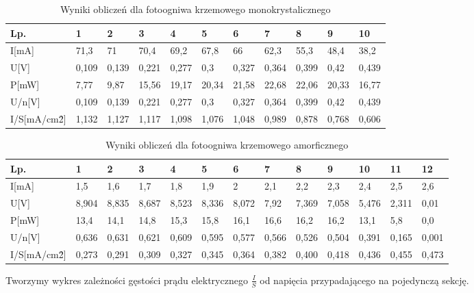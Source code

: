 \documentclass{article}
\begin{document}
\begin{table}[H]
    \centering
    \begin{tabular}{|l|l|l|l|l|l|l|l|l|l|l|}
    \hline
        Lp. & 1 & 2 & 3 & 4 & 5 & 6 & 7 & 8 & 9 & 10 \\ \hline
        I[mA] & 71,3 & 71 & 70,4 & 69,2 & 67,8 & 66 & 62,3 & 55,3 & 48,4 & 38,2 \\ \hline
        U[V] & 0,109 & 0,139 & 0,221 & 0,277 & 0,3 & 0,327 & 0,364 & 0,399 & 0,42 & 0,439 \\ \hline
        P[mW] & 7,77 & 9,87 & 15,56 & 19,17 & 20,34 & 21,58 & 22,68 & 22,06 & 20,33 & 16,77 \\ \hline
        U/n[V] & 0,109 & 0,139 & 0,221 & 0,277 & 0,3 & 0,327 & 0,364 & 0,399 & 0,42 & 0,439 \\ \hline
        I/S[mA/cm\^2] & 1,132 & 1,127 & 1,117 & 1,098 & 1,076 & 1,048 & 0,989 & 0,878 & 0,768 & 0,606   \\ \hline
    \end{tabular}
    \caption{Wyniki obliczeń dla fotoogniwa krzemowego monokrystalicznego}
     \label{obl:2}
\end{table}
\begin{table}[H]
    \centering
    \begin{tabular}{|l|l|l|l|l|l|l|l|l|l|l|l|l|}
    \hline
        Lp. & 1 & 2 & 3 & 4 & 5 & 6 & 7 & 8 & 9 & 10 & 11 & 12 \\ \hline
        I[mA] & 1,5 & 1,6 & 1,7 & 1,8 & 1,9 & 2 & 2,1 & 2,2 & 2,3 & 2,4 & 2,5 & 2,6 \\ \hline
        U[V] & 8,904 & 8,835 & 8,687 & 8,523 & 8,336 & 8,072 & 7,92 & 7,369 & 7,058 & 5,476 & 2,311 & 0,01 \\ \hline
        P[mW] & 13,4 & 14,1 & 14,8 & 15,3 & 15,8 & 16,1 & 16,6 & 16,2 & 16,2 & 13,1 & 5,8 & 0,0 \\ \hline
        U/n[V] & 0,636 & 0,631 & 0,621 & 0,609 & 0,595 & 0,577 & 0,566 & 0,526 & 0,504 & 0,391 & 0,165 & 0,001 \\ \hline
        I/S[mA/cm\^2] & 0,273 & 0,291 & 0,309 & 0,327 & 0,345 & 0,364 & 0,382 & 0,400 & 0,418 & 0,436 & 0,455 & 0,473 \\ \hline
    \end{tabular}
    \caption{Wyniki obliczeń dla fotoogniwa krzemowego amorficznego}
 \label{obl:3}
\end{table}
\newpage
Tworzymy wykres zależności gęstości prądu elektrycznego $\frac{I}{S}$
od napięcia przypadającego na pojedynczą sekcję.
\end{document}
